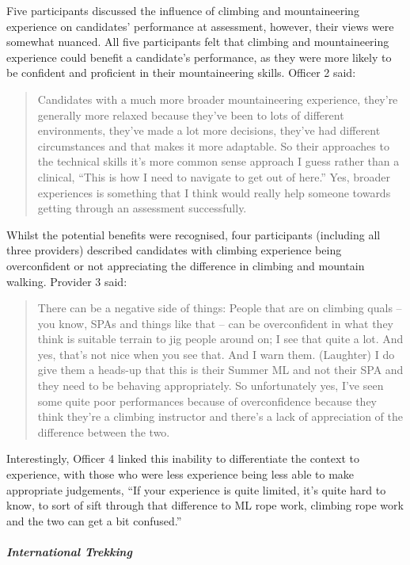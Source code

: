 \documentclass[
  12pt,
  a4paper,
]{book}
\begin{document}
Five participants discussed the influence of climbing and mountaineering experience on candidates' performance at assessment, however, their views were somewhat nuanced. All five participants felt that climbing and mountaineering experience could benefit a candidate's performance, as they were more likely to be confident and proficient in their mountaineering skills. Officer 2 said:

\begin{quote}
Candidates with a much more broader mountaineering experience, they're generally more relaxed because they've been to lots of different environments, they've made a lot more decisions, they've had different circumstances and that makes it more adaptable. So their approaches to the technical skills it's more common sense approach I guess rather than a clinical, ``This is how I need to navigate to get out of here.'' Yes, broader experiences is something that I think would really help someone towards getting through an assessment successfully.
\end{quote}

Whilst the potential benefits were recognised, four participants (including all three providers) described candidates with climbing experience being overconfident or not appreciating the difference in climbing and mountain walking. Provider 3 said:

\begin{quote}
There can be a negative side of things: People that are on climbing quals -- you know, SPAs and things like that -- can be overconfident in what they think is suitable terrain to jig people around on; I see that quite a lot. And yes, that's not nice when you see that. And I warn them. (Laughter) I do give them a heads-up that this is their Summer ML and not their SPA and they need to be behaving appropriately. So unfortunately yes, I've seen some quite poor performances because of overconfidence because they think they're a climbing instructor and there's a lack of appreciation of the difference between the two.
\end{quote}

Interestingly, Officer 4 linked this inability to differentiate the context to experience, with those who were less experience being less able to make appropriate judgements, ``If your experience is quite limited, it's quite hard to know, to sort of sift through that difference to ML rope work, climbing rope work and the two can get a bit confused.''

\hypertarget{international-trekking}{%
\subparagraph{International Trekking}\label{international-trekking}}
\end{document}
